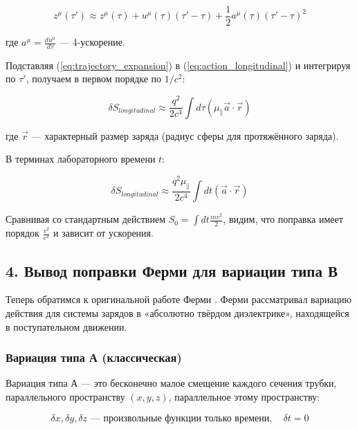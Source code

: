 \documentclass[12pt, a4paper]{article}
\begin{document}
\begin{equation}
z^\mu(\tau') \approx z^\mu(\tau) + u^\mu(\tau)(\tau' - \tau) + \frac{1}{2}a^\mu(\tau)(\tau' - \tau)^2
\label{eq:trajectory_expansion}
\end{equation}

где $a^\mu = \frac{du^\mu}{d\tau}$ — 4-ускорение.

Подставляя (\ref{eq:trajectory_expansion}) в (\ref{eq:action_longitudinal}) и интегрируя по $\tau'$, получаем в первом порядке по $1/c^2$:

\begin{equation}
\delta S_{longitudinal} \approx \frac{q^2}{2c^4} \int d\tau \left(\mu_{\parallel} \vec{a} \cdot \vec{r}\right)
\label{eq:action_expanded}
\end{equation}

где $\vec{r}$ — характерный размер заряда (радиус сферы для протяжённого заряда).

В терминах лабораторного времени $t$:

\begin{equation}
\delta S_{longitudinal} \approx \frac{q^2\mu_{\parallel}}{2c^4} \int dt \left(\vec{a} \cdot \vec{r}\right)
\label{eq:action_time}
\end{equation}

Сравнивая со стандартным действием $S_0 = \int dt \frac{mv^2}{2}$, видим, что поправка имеет порядок $\frac{v^2}{c^2}$ и зависит от ускорения.

\subsection{4. Вывод поправки Ферми для вариации типа В}

Теперь обратимся к оригинальной работе Ферми \cite{Fermi1923}. Ферми рассматривал вариацию действия для системы зарядов в «абсолютно твёрдом диэлектрике», находящейся в поступательном движении.

\subsubsection{Вариация типа А (классическая)}

Вариация типа А — это бесконечно малое смещение каждого сечения трубки, параллельного пространству $(x, y, z)$, параллельное этому пространству:

\begin{equation}
\delta x, \delta y, \delta z \text{ — произвольные функции только времени}, \quad \delta t = 0
\label{eq:variation_A}
\end{equation}
\end{document}
